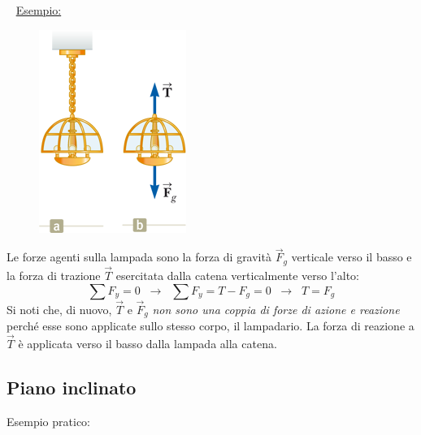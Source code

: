 \documentclass[a4paper,11pt,oneside]{book}
\begin{document}
~\newline
\underline{Esempio: }
\begin{figure}[h]
    \centering
    \includegraphics[scale=1]{lampada_in_equilibrio}
\end{figure}
Le forze agenti sulla lampada sono la forza di gravità $\vec{F}_g$ verticale verso il basso e la forza di trazione $\vec{T}$ esercitata dalla catena verticalmente verso l'alto:
\begin{equation*}
    \sum F_y = 0 \;\; \rightarrow \;\; \sum F_y = T - F_g = 0 \;\; \rightarrow \;\; T = F_g
\end{equation*}
Si noti che, di nuovo, $\vec{T}$ e $\vec{F}_g$ \emph{non sono una coppia di forze di azione e reazione} perché esse sono applicate sullo stesso corpo, il lampadario.
La forza di reazione a $\vec{T}$  è applicata verso il basso dalla lampada alla catena.

\newpage
\subsection{Piano inclinato}
Esempio pratico:
\end{document}
